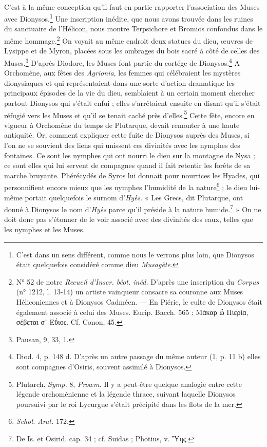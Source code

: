 \documentclass[landscape, a4paper, 11pt, oneside, polutonikogreek, french]{article}
\begin{document}
\paragraph{}
C'est à la même conception qu'il faut en partie rapporter l'association des Muses avec Dionysos.\footnote{C'est dans un sens différent, comme nous le verrons plus loin, que Dionysos était quelquefois considéré comme dieu \emph{Musagète}.} Une inscription inédite, que nous avons trouvée dans les ruines du sanctuaire de l'Hélicon, nous montre Terpsichore et Bromios confondus dans le même hommage.\footnote{N° 52 de notre \emph{Recueil d'Inscr. béot. inéd.} D'après une inscription du \emph{Corpus} (n° 1212, l. 13-14) un artiste vainqueur consacre sa couronne aux Muses Héliconiennes et à Dionysos Cadméen. --- En Piérie, le culte de Dionysos était également associé à celui des Muses. Eurip. Bacch. 565 : Μάκαρ ὦ Πιερία, σέβεται σ᾽ Εΰιος. Cf. Conon, 45.} On voyait au même endroit deux statues du dieu, œuvres de Lysippe et de Myron, placées sous les ombrages du bois sacré à côté de celles des Muses.\footnote{Pausan, 9, 33, 1.} D'après Diodore, les Muses font partie du cortége de Dionysos.\footnote{Diod. 4, p. 148 d. D'après un autre passage du même auteur (1, p. 11 b) elles sont compagnes d'Osiris, souvent assimilé à Dionysos.} A Orchomène, aux fêtes des \emph{Agrionia}, les femmes qui célébraient les mystères dionysiaques et qui représentaient dans une sorte d'action dramatique les principaux épisodes de la vie du dieu, semblaient à un certain moment chercher partout Dionysos qui s'était enfui ; elles s'arrêtaient ensuite en disant qu'il s'était réfugié vers les Muses et qu'il se tenait caché près d'elles.\footnote{Plutarch. \emph{Symp.} 8, \emph{Proœm.} Il y a peut-être quelque analogie entre cette légende orchoménienne et la légende thrace, suivant laquelle Dionysos poursuivi par le roi Lycurgue s'était précipité dans les flots de la mer.} Cette fête, encore en vigueur à Orchomène du temps de Plutarque, devait remonter à une haute antiquité. Or, comment expliquer cette fuite de Dionysos auprès des Muses, si l'on ne se souvient des liens qui unissent ces divinités avec les nymphes des fontaines. Ce sont les nymphes qui ont nourri le dieu sur la montagne de Nysa ; ce sont elles qui lui servent de compagnes quand il fait retentir les forêts de sa marche bruyante. Phérécydés de Syros lui donnait pour nourrices les Hyades, qui personnifient encore mieux que les nymphes l'humidité de la nature\footnote{\emph{Schol. Arat.} 172.} ; le dieu lui-même portait quelquefois le surnom d'\emph{Hyès}. « Les Grecs, dit Plutarque, ont donné à Dionysos le nom d'\emph{Hyès} parce qu'il préside à la nature humide.\footnote{De Is. et Osirid. cap. 34 ; cf. Suidas ; Photius, v. Ὕης.} » On ne doit donc pas s'étonner de le voir associé avec des divinités des eaux, telles que les nymphes et les Muses.
\end{document}
